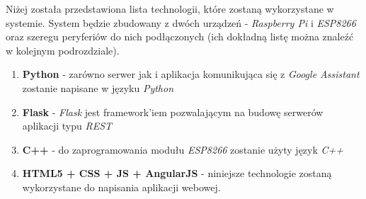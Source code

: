 Niżej została przedstawiona lista technologii, które zostaną wykorzystane w systemie. System będzie zbudowany z dwóch urządzeń - \emph{Raspberry Pi} i \emph{ESP8266} oraz szeregu peryferiów do nich podłączonych (ich dokładną listę można znaleźć w kolejnym podrozdziale).

\begin{enumerate}

\item \textbf{Python} - zarówno serwer jak i aplikacja komunikująca się z \emph{Google Assistant} zostanie napisane w języku \emph{Python}

\item \textbf{Flask} - \emph{Flask} jest framework'iem pozwalającym na budowę serwerów aplikacji typu \emph{REST}

\item \textbf{C++} - do zaprogramowania modułu \emph{ESP8266} zostanie użyty język \emph{C++}

\item \textbf{HTML5 + CSS + JS + AngularJS} - niniejsze technologie zostaną wykorzystane do napisania aplikacji webowej. 



\end{enumerate}